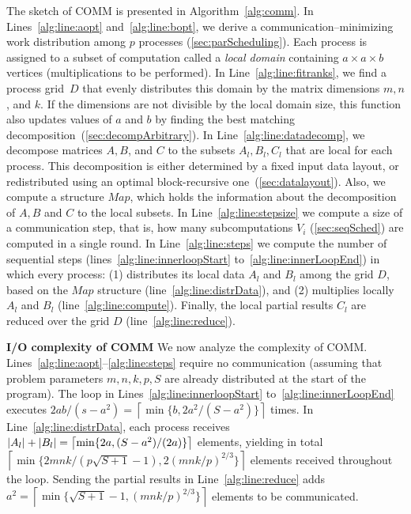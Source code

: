 \documentclass[sigplan,review,anonymous,10pt]{acmart}\settopmatter{printfolios=true,printccs=false,printacmref=false}
\newcommand\mac[1]{\textcolor{red}{[Mac: #1]}}
\newcommand{\macb}[1]{\textbf{\textsf{#1}}}
\begin{document}
The sketch of COMM is presented in Algorithm~\ref{alg:comm}. In
Lines~\ref{alg:line:aopt} and~\ref{alg:line:bopt}, we derive a 
communication--minimizing work distribution among $p$ 
processes (\cref{sec:parScheduling}). Each process is assigned to a subset of 
computation called a \emph{local domain} containing $a \times a 
\times b$ vertices (multiplications to be performed). In 
Line~\ref{alg:line:fitranks}, we 
find a process
grid~$D$ that evenly distributes this domain by the matrix dimensions $m,n$,
and $k$. If the dimensions are not divisible by the local domain size, this
function also updates values of $a$ and $b$ by finding the best matching
decomposition~(\cref{sec:decompArbitrary}).  In Line~\ref{alg:line:datadecomp}, 
we decompose matrices $A, B$, and $C$ to the subsets $A_l, B_l, C_l$ that are 
local for 
each process.
This decomposition is either  
%
determined by a fixed input data layout, or redistributed using an optimal 
block-recursive
one~(\cref{sec:datalayout}). Also, we compute a structure $Map$, which holds 
the information about the decomposition of $A,B$ and $C$ to the local subsets.
In Line~\ref{alg:line:stepsize} we compute a size of a 
communication step, that is, how many subcomputations $V_i$ 
(\cref{sec:seqSched}) are computed in a single round.
In Line~\ref{alg:line:steps} we 
compute the number of
sequential steps (lines~\ref{alg:line:innerloopStart}
to~\ref{alg:line:innerLoopEnd}) in which every process: (1) distributes its
local data $A_l$ and $B_l$  among the grid $D$, based on the $Map$ structure
(line~\ref{alg:line:distrData}), and (2) multiplies locally $A_l$ and $B_l$
(line~\ref{alg:line:compute}). Finally, the local partial results $C_l$ are
reduced over the grid $D$ (line~\ref{alg:line:reduce}).

\macb{I/O complexity of COMM}
We now analyze the complexity of COMM. 
Lines~\ref{alg:line:aopt}--\ref{alg:line:steps} require no communication 
(assuming that problem 
parameters $m, n, k, p, S$ are already distributed at the start of the program).
The loop in Lines~\ref{alg:line:innerloopStart} to~\ref{alg:line:innerLoopEnd} 
executes $2ab/(s-a^2) = 
\left\lceil{\min\{b, 2a^2/(S-a^2) \}} \right \rceil$ times. In 
Line~\ref{alg:line:distrData}, each process receives $|A_l| + |B_l| = \linebreak
\left\lceil{\min\{2a, (S-a^2)/(2a) \}} \right \rceil$ elements, yielding in 
total \linebreak$\left\lceil{\min\{2mnk/(p\sqrt{S + 1} - 1), 2(mnk/p)^{2/3} \}} 
\right 
\rceil$ elements received throughout the loop. Sending the partial results in 
Line~\ref{alg:line:reduce} adds $a^2 = \left\lceil{\min\{\sqrt{S+1} - 1, 
(mnk/p)^{2/3}\}}\right\rceil$ 
elements to be communicated.
\end{document}
